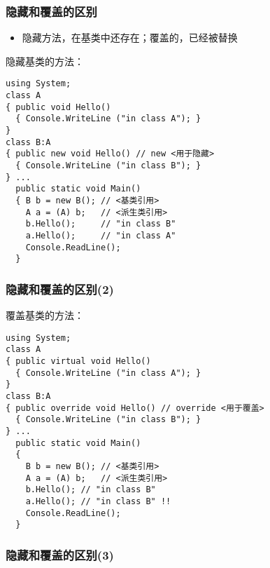 \begin{frame}[fragile]
\frametitle{隐藏和覆盖的区别}
\begin{itemize}
\item 隐藏方法，在基类中还存在；覆盖的，已经被替换
\end{itemize}
隐藏基类的方法：
\begin{lstlisting}[escapeinside=<>]
using System;
class A
{ public void Hello()
  { Console.WriteLine ("in class A"); }
}
class B:A
{ public new void Hello() // new <用于隐藏>
  { Console.WriteLine ("in class B"); }
} ...
  public static void Main()
  { B b = new B(); // <基类引用>
    A a = (A) b;   // <派生类引用>
    b.Hello();     // "in class B"
    a.Hello();     // "in class A"
    Console.ReadLine();
  }

\end{lstlisting}
\end{frame}

\begin{frame}[fragile]
\frametitle{隐藏和覆盖的区别(2)}
覆盖基类的方法：
\begin{lstlisting}[escapeinside=<>]
using System;
class A
{ public virtual void Hello()
  { Console.WriteLine ("in class A"); }
}
class B:A
{ public override void Hello() // override <用于覆盖>
  { Console.WriteLine ("in class B"); }
} ...
  public static void Main()
  {
    B b = new B(); // <基类引用>
    A a = (A) b;   // <派生类引用>
    b.Hello(); // "in class B"
    a.Hello(); // "in class B" !!
    Console.ReadLine();
  }

\end{lstlisting}
\end{frame}

\begin{frame}[fragile]
\frametitle{隐藏和覆盖的区别(3)}
\begin{columns}
  \begin{figure}
    \centering
    
  \end{figure}
\end{columns}
\end{frame}

